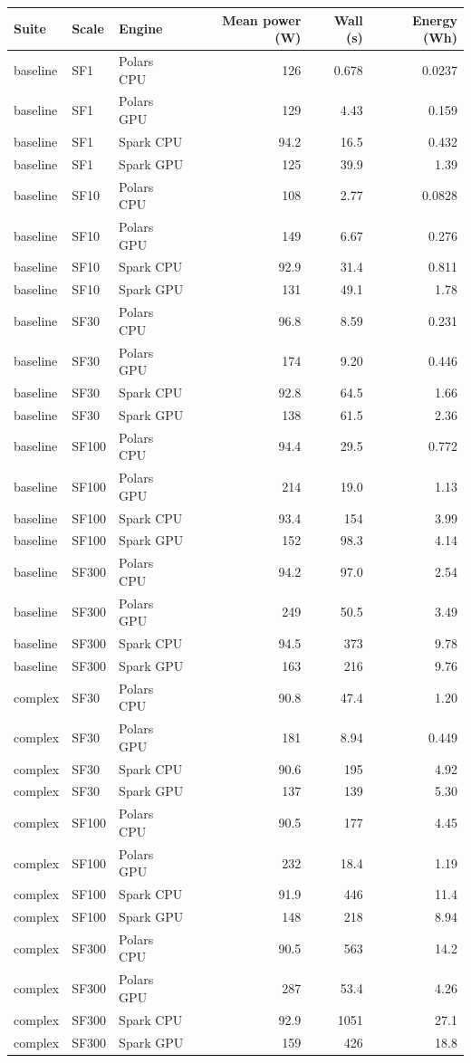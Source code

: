 \begin{longtable}{lllrrr}
\toprule
Suite & Scale & Engine & Mean power (W) & Wall (s) & Energy (Wh) \\
\midrule
\endhead
\bottomrule
\endfoot
baseline & SF1 & Polars CPU & 126 & 0.678 & 0.0237 \\
baseline & SF1 & Polars GPU & 129 & 4.43 & 0.159 \\
baseline & SF1 & Spark CPU & 94.2 & 16.5 & 0.432 \\
baseline & SF1 & Spark GPU & 125 & 39.9 & 1.39 \\
baseline & SF10 & Polars CPU & 108 & 2.77 & 0.0828 \\
baseline & SF10 & Polars GPU & 149 & 6.67 & 0.276 \\
baseline & SF10 & Spark CPU & 92.9 & 31.4 & 0.811 \\
baseline & SF10 & Spark GPU & 131 & 49.1 & 1.78 \\
baseline & SF30 & Polars CPU & 96.8 & 8.59 & 0.231 \\
baseline & SF30 & Polars GPU & 174 & 9.20 & 0.446 \\
baseline & SF30 & Spark CPU & 92.8 & 64.5 & 1.66 \\
baseline & SF30 & Spark GPU & 138 & 61.5 & 2.36 \\
baseline & SF100 & Polars CPU & 94.4 & 29.5 & 0.772 \\
baseline & SF100 & Polars GPU & 214 & 19.0 & 1.13 \\
baseline & SF100 & Spark CPU & 93.4 & 154 & 3.99 \\
baseline & SF100 & Spark GPU & 152 & 98.3 & 4.14 \\
baseline & SF300 & Polars CPU & 94.2 & 97.0 & 2.54 \\
baseline & SF300 & Polars GPU & 249 & 50.5 & 3.49 \\
baseline & SF300 & Spark CPU & 94.5 & 373 & 9.78 \\
baseline & SF300 & Spark GPU & 163 & 216 & 9.76 \\
complex & SF30 & Polars CPU & 90.8 & 47.4 & 1.20 \\
complex & SF30 & Polars GPU & 181 & 8.94 & 0.449 \\
complex & SF30 & Spark CPU & 90.6 & 195 & 4.92 \\
complex & SF30 & Spark GPU & 137 & 139 & 5.30 \\
complex & SF100 & Polars CPU & 90.5 & 177 & 4.45 \\
complex & SF100 & Polars GPU & 232 & 18.4 & 1.19 \\
complex & SF100 & Spark CPU & 91.9 & 446 & 11.4 \\
complex & SF100 & Spark GPU & 148 & 218 & 8.94 \\
complex & SF300 & Polars CPU & 90.5 & 563 & 14.2 \\
complex & SF300 & Polars GPU & 287 & 53.4 & 4.26 \\
complex & SF300 & Spark CPU & 92.9 & 1051 & 27.1 \\
complex & SF300 & Spark GPU & 159 & 426 & 18.8 \\
\end{longtable}
